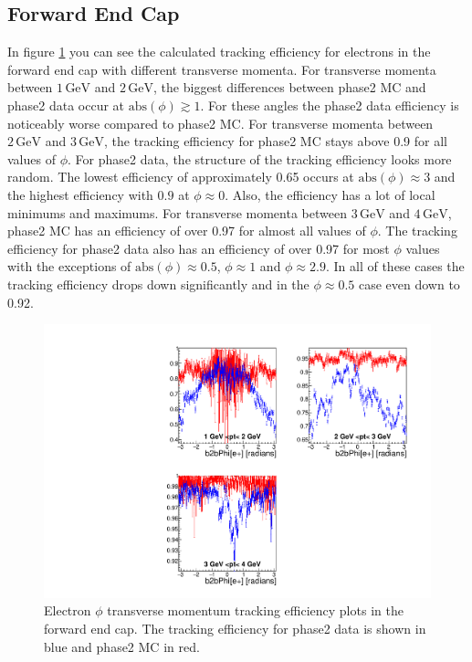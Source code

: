 \documentclass[a4paper,11pt,twosided,final,german,openbib,pdftex,listof=totoc,bibliography=totoc]{scrbook}
\begin{document}
\subsection{Forward End Cap}

In figure \ref{plt:xPtMPhiemFC} you can see the calculated tracking efficiency for electrons in the forward end cap  with different transverse momenta. For transverse momenta between $1\,\textrm{GeV}$ and $2\,\textrm{GeV}$, the biggest differences between phase2 MC and phase2 data occur at $\textrm{abs}(\phi) \gtrsim 1$. For these angles the phase2 data efficiency is noticeably worse compared to phase2 MC. For transverse momenta between $2\,\textrm{GeV}$ and $3\,\textrm{GeV}$, the tracking efficiency for phase2 MC stays above 0.9 for all values of $\phi$. For phase2 data, the structure of the tracking efficiency looks more random. The lowest efficiency of approximately 0.65 occurs at $\textrm{abs}(\phi) \approx 3$ and the highest efficiency with $0.9$ at $\phi \approx 0$. Also, the efficiency has a lot of local minimums and maximums. For transverse momenta between $3\,\textrm{GeV}$ and $4\,\textrm{GeV}$, phase2 MC has an efficiency of over 0.97 for almost all values of $\phi$. The tracking efficiency for phase2 data also has an efficiency of over 0.97 for most $\phi$ values with the exceptions of $\textrm{abs}(\phi) \approx 0.5$, $\phi  \approx 1$ and $\phi \approx 2.9$. In all of these cases the tracking efficiency drops down significantly and in the $\phi \approx 0.5$ case even down to 0.92.

\begin{figure}[!htbp]
	\centering
	\includegraphics[width=\textwidth]{Plots/master/xPtMPhiemFC}
	\caption[Transverse Momentum $\phi$ Electron Forward End Cap Efficiency Phase2]{Electron $\phi$ transverse momentum tracking efficiency plots in the forward end cap. The tracking efficiency for phase2 data is shown in blue and phase2 MC in red.
		\label{plt:xPtMPhiemFC}}
\end{figure}
\end{document}
